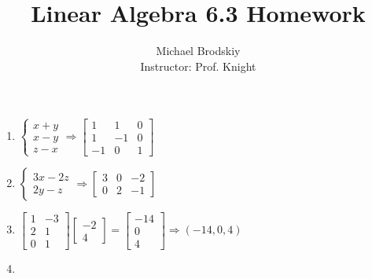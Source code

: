 \documentclass[12pt]{article}
\title{Linear Algebra 6.3 Homework}
\date{}
\author{Michael Brodskiy\\ \small Instructor: Prof. Knight}
\begin{document}
\maketitle

\begin{enumerate}

    \begin{center}
      \underline{3, 5, 9, 15, 21, 37, 39, 42-49 odd, 51a}
    \end{center}

    \setcounter{enumi}{2}

  \item $\left\{\begin{array}{c} x+y\\x-y\\z-x\end{array}\Rightarrow\begin{bmatrix} 1 & 1 & 0\\ 1 & -1 & 0\\ -1 & 0 & 1\end{bmatrix}$

    \setcounter{enumi}{4}

  \item $\left\{\begin{array}{c} 3x-2z\\2y-z\end{array}\Rightarrow\begin{bmatrix} 3 & 0 & -2\\ 0 & 2 & -1  \end{bmatrix}$

    \setcounter{enumi}{8}

  \item $\begin{bmatrix} 1 & -3\\ 2 & 1\\ 0 & 1\end{bmatrix}\begin{bmatrix} -2\\4\end{bmatrix}=\begin{bmatrix} -14\\0\\4\end{bmatrix}\Rightarrow(-14,0,4)$

    \setcounter{enumi}{14}

  \item

    \begin{enumerate}


\end{enumerate}
\end{enumerate}
\end{document}

